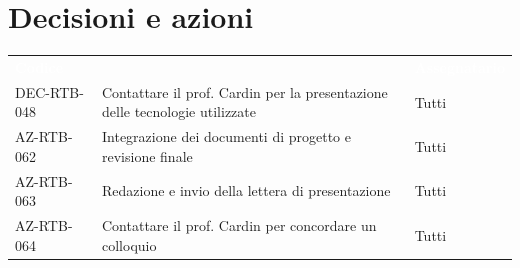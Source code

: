 \documentclass[a4paper, 11pt]{article}
\begin{document}
\section{Decisioni e azioni} \label{DecisioniAzioni}
\begin{center}
    \begin{tabular}{>{\centering\arraybackslash}m{3cm} >{\raggedright\arraybackslash}p{7cm} >{\centering\arraybackslash}p{2.5cm}}
        \rowcolor{AccentColor}
        \textcolor{white}{\textbf{Codice }} & 
        \multicolumn{1}{c}{\textcolor{white}{\textbf{Descrizione}}} & 
        \textcolor{white}{\textbf{Assegnatario}} \\
        
        DEC-RTB-048 & Contattare il prof. Cardin per la presentazione delle tecnologie utilizzate & Tutti \\
        \midrule
        AZ-RTB-062 & Integrazione dei documenti di progetto e revisione finale & Tutti \\
        AZ-RTB-063 & Redazione e invio della lettera di presentazione & Tutti \\
        AZ-RTB-064 & Contattare il prof. Cardin per concordare un colloquio & Tutti \\
    \end{tabular}
\end{center}
\end{document}
